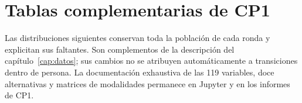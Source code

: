 \chapter{Tablas complementarias de CP1}
\label{ap:tablas-cp1}

Las distribuciones siguientes conservan toda la población de cada ronda y
explicitan sus faltantes. Son complementos de la descripción del
capítulo~\ref{cap:datos}; sus cambios no se atribuyen automáticamente a
transiciones dentro de persona. La documentación exhaustiva de las 119
variables, doce alternativas y matrices de modalidades permanece en Jupyter
y en los informes de CP1.





\clearpage

